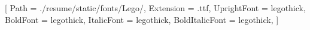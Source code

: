 
[
Path = ./resume/static/fonts/Lego/,
Extension = .ttf,
UprightFont = legothick,
BoldFont = legothick,
ItalicFont = legothick,
BoldItalicFont = legothick,
]